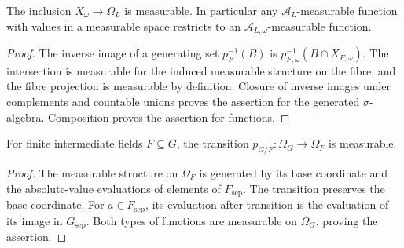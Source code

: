 \begin{lemma}\label{lem:algebraic-fibre-measurable}
\leanok
{}
The inclusion $X_\omega\to\Omega_L$ is measurable. In particular any
$\mathcal A_L$-measurable function with values in a measurable space
restricts to an $\mathcal A_{L,\omega}$-measurable function.
\end{lemma}
\begin{proof}
The inverse image of a generating set $p_F^{-1}(B)$ is
$p_{F,\omega}^{-1}(B\cap X_{F,\omega})$. The intersection is measurable
for the induced measurable structure on the fibre, and the fibre
projection is measurable by definition. Closure of inverse
images under complements and countable unions proves the assertion
for the generated $\sigma$-algebra. Composition proves the assertion
for functions.
\end{proof}

\begin{lemma}\label{lem:finite-stage-transitions-measurable}
\leanok
{}
For finite intermediate fields $F\subseteq G$, the transition
$p_{G/F}:\Omega_G\to\Omega_F$ is measurable.
\end{lemma}
\begin{proof}
The measurable structure on $\Omega_F$ is generated by its base
coordinate and the absolute-value evaluations of elements of
$F_{\mathrm{sep}}$. The transition preserves the base coordinate.
For $a\in F_{\mathrm{sep}}$, its evaluation after transition is the
evaluation of its image in $G_{\mathrm{sep}}$. Both types of functions
are measurable on $\Omega_G$, proving the assertion.
\end{proof}


